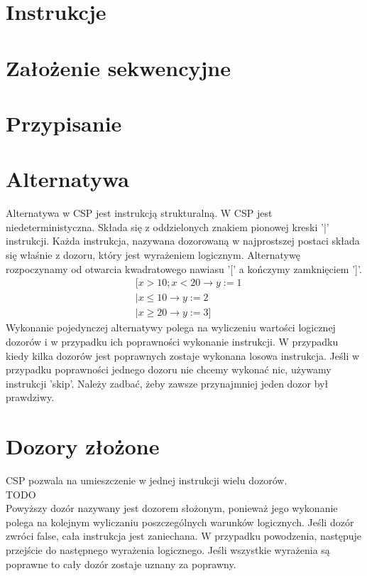 \documentclass[12pt,a4paper]{article}
\begin{document}
  \section{Instrukcje}

  \section{Założenie sekwencyjne}

  \section{Przypisanie}

  \section{Alternatywa}
  Alternatywa w CSP jest instrukcją strukturalną.
  W CSP jest niedeterministyczna.
  Składa się z oddzielonych znakiem pionowej kreski '|' instrukcji.
  Każda instrukcja, nazywana dozorowaną w najprostszej postaci składa się właśnie z dozoru, który jest wyrażeniem logicznym.
  Alternatywę rozpoczynamy od otwarcia kwadratowego nawiasu '[' a kończymy zamknięciem ']'.
  \begin{equation}
    \begin{split}
      &\lbrack x > 10; x < 20 \rightarrow y := 1\\
      &|x \leq 10 \rightarrow y := 2\\
      &|x \geq 20 \rightarrow y := 3 \rbrack
    \end{split}
  \end{equation}
  Wykonanie pojedynczej alternatywy polega na wyliczeniu wartości logicznej dozorów i w przypadku ich poprawności wykonanie instrukcji.
  W przypadku kiedy kilka dozorów jest poprawnych zostaje wykonana losowa instrukcja.
  Jeśli w przypadku poprawności jednego dozoru nie chcemy wykonać nic, używamy instrukcji 'skip'.
  Należy zadbać, żeby zawsze przynajmniej jeden dozor był prawdziwy.

  \section{Dozory złożone}
  CSP pozwala na umieszczenie w jednej instrukcji wielu dozorów.\\
  TODO\\
  Powyższy dozór nazywany jest dozorem słożonym, ponieważ jego wykonanie polega na kolejnym wyliczaniu poszczególnych warunków logicznych.
  Jeśli dozór zwróci false, cała instrukcja jest zaniechana.
  W przypadku powodzenia, następuje przejście do następnego wyrażenia logicznego.
  Jeśli wszystkie wyrażenia są poprawne to cały dozór zostaje uznany za poprawny.
\end{document}

